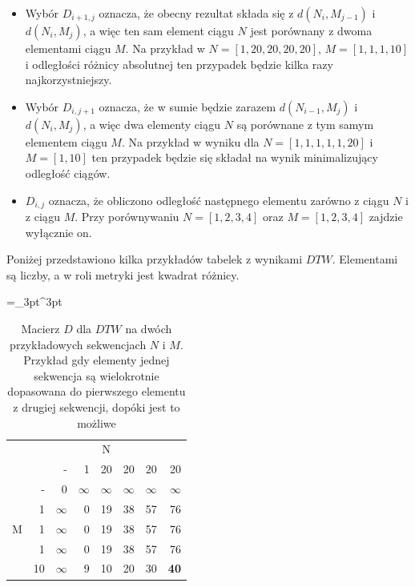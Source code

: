 \begin{itemize}
    \item Wybór $D_{i+1, j}$ oznacza, że obecny rezultat składa się z $d(N_i, M_{j-1})$ i $d(N_i, M_j)$, a więc ten sam element ciągu $N$ jest porównany z dwoma elementami ciągu $M$. Na przykład w $N = [1, 20, 20, 20, 20]$, $M = [1, 1, 1, 10]$ i odległości różnicy absolutnej ten przypadek będzie kilka razy najkorzystniejszy.
    \item Wybór $D_{i, j+1}$ oznacza, że w sumie będzie zarazem $d(N_{i-1}, M_j)$ i $d(N_i, M_j)$, a więc dwa elementy ciągu $N$ są porównane z tym samym elementem ciągu $M$. Na przykład w wyniku dla $N = [1, 1, 1, 1, 1, 20]$ i $ M = [1, 10]$ ten przypadek będzie się składał na wynik minimalizujący odległość ciągów.
    \item $D_{i, j}$ oznacza, że obliczono odległość następnego elementu zarówno z ciągu $N$ i z ciągu $M$. Przy porównywaniu $N = [1, 2, 3, 4]$ oraz $M = [1, 2, 3, 4]$ zajdzie wyłącznie on.
\end{itemize}

Poniżej przedstawiono kilka przykładów tabelek z wynikami $DTW$. Elementami są liczby, a w roli metryki jest kwadrat różnicy.

\begin{table}[H]
    \caption{Macierz $D$ dla $DTW$ na dwóch przykładowych sekwencjach $N$ i $M$. Przykład gdy elementy jednej sekwencja są wielokrotnie dopasowana do pierwszego elementu z drugiej sekwencji, dopóki jest to możliwe}
    \centering
    \label{tab:dtw_example0}
    \small
    \tabulinesep =_3pt^3pt
    \begin{tabu}{r*{7}{r}}
         & & 
        \\
        & & - & 1 & 20 & 20 & 20 & 20
        \\ \midrule
         & - & 0 & $\infty$ & $\infty$ & $\infty$ & $\infty$ & $\infty$
        \\
        & 1 & $\infty$ & 0 & 19 & 38 & 57 & 76
        \\
        & 1 & $\infty$ & 0 & 19 & 38 & 57 & 76
        \\
        & 1 & $\infty$ & 0 & 19 & 38 & 57 & 76
        \\
        & 10 & $\infty$ & 9 & 10 & 20 & 30 & \textbf{40}
        \\
    \end{tabu}
\end{table}

